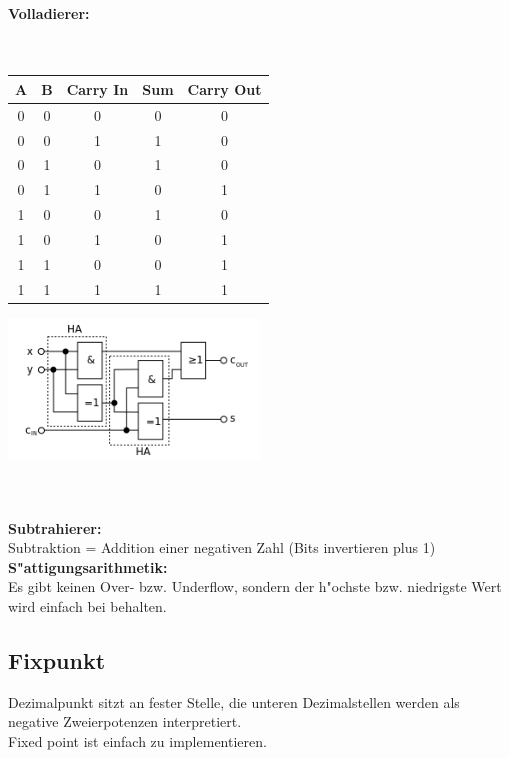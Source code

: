 \paragraph{Volladierer:}~\\
\begin{minipage}{0.5\textwidth}
	\begin{tabular}{|c | c | c | c | c |}
	\hline
	A & B & Carry In & Sum & Carry Out\\
	\hline
	0 & 0 & 0 & 0 & 0\\
	\hline
	0 & 0 & 1 & 1 & 0\\
	\hline
	0 & 1 & 0 & 1 & 0\\
	\hline
	0 & 1 & 1 & 0 & 1\\
	\hline
	1 & 0 & 0 & 1 & 0\\
	\hline
	1 & 0 & 1 & 0 & 1\\
	\hline
	1 & 1 & 0 & 0 & 1\\
	\hline
	1 & 1 & 1 & 1 & 1\\
	\hline
	\end{tabular}
\end{minipage}
\begin{minipage}{0.9\textwidth}
	\begin{flushleft}
	{\includegraphics[width=0.5\textwidth]{images/Arithmetik/volladdierer.png}}
	\label{Fig: Volladdierer}
	\end{flushleft}
\end{minipage}\\ \\

\textbf{Subtrahierer:}\\
Subtraktion = Addition einer negativen Zahl (Bits invertieren plus 1)\\

\textbf{S"attigungsarithmetik:}\\
Es gibt keinen Over- bzw. Underflow, sondern der h"ochste bzw. niedrigste Wert wird einfach bei behalten.
\subsection{Fixpunkt}
Dezimalpunkt sitzt an fester Stelle, die unteren Dezimalstellen werden als negative Zweierpotenzen interpretiert. \\
Fixed point ist einfach zu implementieren. 
